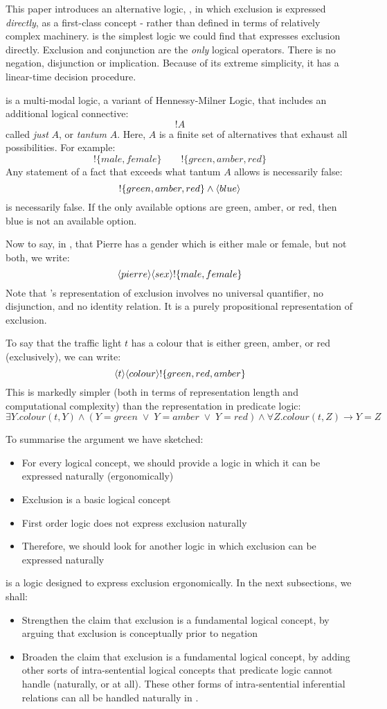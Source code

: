This paper introduces an alternative logic, \ELFULL{}, in which exclusion is expressed \emph{directly}, as a first-class concept - rather than defined in terms of relatively complex machinery.
\ELFULL{} is the simplest logic we could find that expresses exclusion directly. 
Exclusion and conjunction are the \emph{only} logical operators. 
There is no negation, disjunction or implication.
Because of its extreme simplicity, it has a linear-time decision procedure.

\ELFULL{} is a multi-modal logic, a variant of Hennessy-Milner Logic, that includes an additional logical connective:
\[
   !A
\]
called \emph{just} $A$, or \emph{tantum} $A$.
Here, $A$ is a finite set of alternatives that exhaust all
possibilities. 
For example:
\[
   !\{male, female\}
      \qquad
   !\{green, amber, red\}
\]
Any statement of a fact that exceeds what tantum $A$ allows is necessarily false:
\[
   !\{green, amber, red\} \land \langle blue \rangle \]
is necessarily false.
If the only available options are green, amber, or red, then blue is not an available option.

Now to say, in \ELFULL{}, that Pierre has a gender which is either male or female, but not both, we write:
\[
\langle pierre \rangle \langle sex \rangle !\{male, female\}
\]
Note that \ELFULL{}'s representation of exclusion involves no universal quantifier, no disjunction, and no identity relation.
It is a purely propositional representation of exclusion.

To say that the traffic light $t$ has a colour that  is either green, amber, or red (exclusively), we can write:
\[
\langle t \rangle \langle colour \rangle !\{green, red, amber\}
\]
This is markedly simpler (both in terms of representation length and computational complexity) than the representation in predicate logic:
\[
\exists Y . colour(t,Y) \land (Y = green \; \lor \; Y = amber \; \lor \; Y = red) \land \forall Z . colour(t,Z) \rightarrow Y = Z
\]

To summarise the argument we have sketched:
\begin{itemize}
\item
For every logical concept, we should provide a logic in which it can be expressed naturally (ergonomically)
\item
Exclusion is a basic logical concept
\item
First order logic does not express exclusion naturally
\item
Therefore, we should look for another logic in which exclusion can be expressed naturally
\end{itemize}
\ELFULL{} is a logic designed to express exclusion ergonomically.
In the next subsections, we shall:
\begin{itemize}
\item
Strengthen the claim that exclusion is a fundamental logical concept, by arguing that exclusion is conceptually prior to negation
\item
Broaden the claim that exclusion is a fundamental logical concept, by adding other sorts of intra-sentential logical concepts that predicate logic cannot handle (naturally, or at all). These other forms of intra-sentential inferential relations can all be handled naturally in \ELFULL{}.
\end{itemize}

